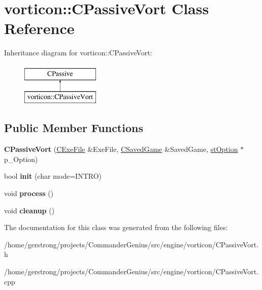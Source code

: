 \hypertarget{classvorticon_1_1_c_passive_vort}{
\section{vorticon::CPassiveVort Class Reference}
\label{classvorticon_1_1_c_passive_vort}
}
Inheritance diagram for vorticon::CPassiveVort:\begin{figure}[H]
\begin{center}
\leavevmode
\includegraphics[height=2cm]{classvorticon_1_1_c_passive_vort}
\end{center}
\end{figure}
\subsection*{Public Member Functions}
\begin{DoxyCompactItemize}
\item 
\hypertarget{classvorticon_1_1_c_passive_vort_a690ce39c24b2d527a41b9d278d8bcc56}{
{\bfseries CPassiveVort} (\hyperlink{class_c_exe_file}{CExeFile} \&ExeFile, \hyperlink{class_c_saved_game}{CSavedGame} \&SavedGame, \hyperlink{structst_option}{stOption} $\ast$p\_\-Option)}
\label{classvorticon_1_1_c_passive_vort_a690ce39c24b2d527a41b9d278d8bcc56}

\item 
\hypertarget{classvorticon_1_1_c_passive_vort_a964d459fd9db7244abaf290116f36994}{
bool {\bfseries init} (char mode=INTRO)}
\label{classvorticon_1_1_c_passive_vort_a964d459fd9db7244abaf290116f36994}

\item 
\hypertarget{classvorticon_1_1_c_passive_vort_add2ceb8216ae01ddbd16a751de4b8a1a}{
void {\bfseries process} ()}
\label{classvorticon_1_1_c_passive_vort_add2ceb8216ae01ddbd16a751de4b8a1a}

\item 
\hypertarget{classvorticon_1_1_c_passive_vort_a1cce1e3183569e7c401ce3efb78f7ef8}{
void {\bfseries cleanup} ()}
\label{classvorticon_1_1_c_passive_vort_a1cce1e3183569e7c401ce3efb78f7ef8}

\end{DoxyCompactItemize}


The documentation for this class was generated from the following files:\begin{DoxyCompactItemize}
\item 
/home/gerstrong/projects/CommanderGenius/src/engine/vorticon/CPassiveVort.h\item 
/home/gerstrong/projects/CommanderGenius/src/engine/vorticon/CPassiveVort.cpp\end{DoxyCompactItemize}
